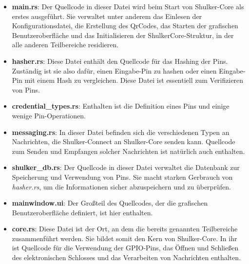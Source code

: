 \begin{itemize}
    \item \textbf{main.rs}: Der Quellcode in dieser Datei wird beim Start von Shulker-Core als erstes ausgeführt. Sie verwaltet unter anderem
    das Einlesen der Konfigurationsdatei, die Erstellung des QrCodes, das Starten der grafischen Benutzeroberfläche und
    das Initialisieren der ShulkerCore-Struktur, in der alle anderen Teilbereiche residieren.

    \item \textbf{hasher.rs}: Diese Datei enthält den Quellcode für das Hashing der Pins. Zuständig ist sie also dafür, einen
    Eingabe-Pin zu hashen oder einen Eingabe-Pin mit einem Hash zu vergleichen. Diese Datei ist essentiell zum Verifizieren von Pins.

    \item \textbf{credential\_types.rs}: Enthalten ist die Definition eines Pins und einige wenige Pin-Operationen.
    
    \item \textbf{messaging.rs}: In dieser Datei befinden sich die verschiedenen Typen an Nachrichten, die Shulker-Connect an
    Shulker-Core senden kann. Quellcode zum Senden und Empfangen solcher Nachrichten ist natürlich auch enthalten.

    \item \textbf{shulker\_db.rs}: Der Quellcode in dieser Datei verwaltet die Datenbank zur Speicherung und Verwendung von Pins.
    Sie macht starken Gerbrauch von \textit{hasher.rs}, um die Informationen sicher abzuspeichern und zu überprüfen.

    \item \textbf{mainwindow.ui}: Der Großteil des Quellcodes, der die grafischen Benutzeroberfläche definiert, ist hier enthalten.

    \item \textbf{core.rs}: Diese Datei ist der Ort, an dem die bereits genannten Teilbereiche zusammenführt werden. Sie bildet somit den Kern von
    Shulker-Core. In ihr ist Quellcode für die Verwendung der GPIO-Pins, das Öffnen und Schließen des elektronischen Schlosses und das Verarbeiten
    von Nachrichten enthalten.
\end{itemize}
